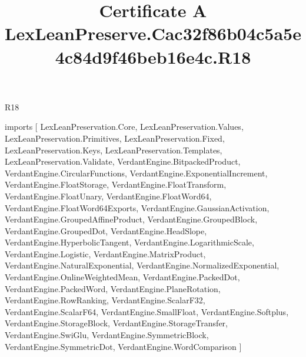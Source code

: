 \begin{lexlean}{R18}
\title{Certificate A LexLeanPreserve.Cac32f86b04c5a5e4c84d9f46beb16e4c.R18}
\begin{coremodule}
imports [
  LexLeanPreservation.Core,
  LexLeanPreservation.Values,
  LexLeanPreservation.Primitives,
  LexLeanPreservation.Fixed,
  LexLeanPreservation.Keys,
  LexLeanPreservation.Templates,
  LexLeanPreservation.Validate,
  VerdantEngine.BitpackedProduct,
  VerdantEngine.CircularFunctions,
  VerdantEngine.ExponentialIncrement,
  VerdantEngine.FloatStorage,
  VerdantEngine.FloatTransform,
  VerdantEngine.FloatUnary,
  VerdantEngine.FloatWord64,
  VerdantEngine.FloatWord64Exports,
  VerdantEngine.GaussianActivation,
  VerdantEngine.GroupedAffineProduct,
  VerdantEngine.GroupedBlock,
  VerdantEngine.GroupedDot,
  VerdantEngine.HeadSlope,
  VerdantEngine.HyperbolicTangent,
  VerdantEngine.LogarithmicScale,
  VerdantEngine.Logistic,
  VerdantEngine.MatrixProduct,
  VerdantEngine.NaturalExponential,
  VerdantEngine.NormalizedExponential,
  VerdantEngine.OnlineWeightedMean,
  VerdantEngine.PackedDot,
  VerdantEngine.PackedWord,
  VerdantEngine.PlaneRotation,
  VerdantEngine.RowRanking,
  VerdantEngine.ScalarF32,
  VerdantEngine.ScalarF64,
  VerdantEngine.SmallFloat,
  VerdantEngine.Softplus,
  VerdantEngine.StorageBlock,
  VerdantEngine.StorageTransfer,
  VerdantEngine.SwiGlu,
  VerdantEngine.SymmetricBlock,
  VerdantEngine.SymmetricDot,
  VerdantEngine.WordComparison
]


\end{coremodule}
\end{lexlean}
